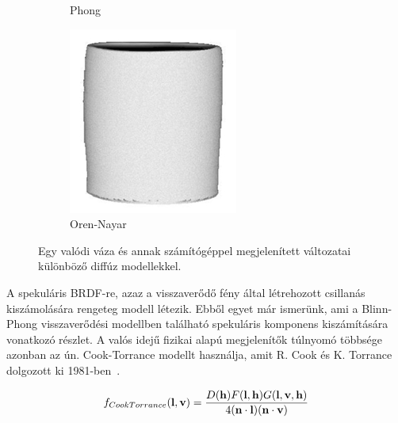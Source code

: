 \begin{figure}[!ht]
\begin{subfigure}[b]{0.25\textwidth}
        \caption{Phong}
    \end{subfigure}
    \hfill
    \begin{subfigure}[b]{0.25\textwidth}
        \includegraphics[width=\textwidth]{images/vase_c.png}
        \caption{Oren-Nayar}
    \end{subfigure}

    \caption{Egy valódi váza és annak számítógéppel megjelenített változatai különböző diffúz modellekkel.}
\end{figure}

A spekuláris BRDF-re, azaz a visszaverődő fény által létrehozott csillanás kiszámolására rengeteg modell létezik. Ebből egyet már ismerünk, ami a Blinn-Phong visszaverődési modellben található spekuláris komponens kiszámítására vonatkozó részlet. A valós idejű fizikai alapú megjelenítők túlnyomó többsége azonban az ún. Cook-Torrance modellt használja, amit R. Cook és K. Torrance dolgozott ki 1981-ben~\cite{cook1981reflectance}.

\[
f_{CookTorrance}(\mathbf{l}, \mathbf{v}) = { {D(\mathbf{h}) F(\mathbf{l}, \mathbf{h}) G(\mathbf{l}, \mathbf{v}, \mathbf{h})} \over {4(\mathbf{n} \cdot \mathbf{l})(\mathbf{n} \cdot \mathbf{v})} }
\]

